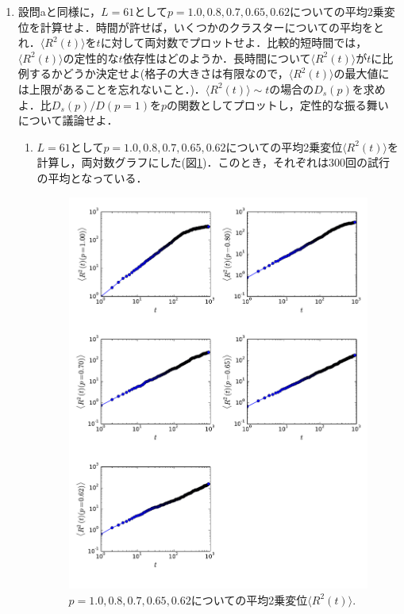 \documentclass{jsarticle}
\begin{document}
\begin{enumerate}
        \item 設問aと同様に，$L=61$として$p=1.0, 0.8, 0.7, 0.65, 0.62$についての平均2乗変位を計算せよ．時間が許せば，いくつかのクラスターについての平均をとれ．$\langle R^{2}(t) \rangle$を$t$に対して両対数でプロットせよ．比較的短時間では，$\langle R^{2}(t) \rangle$の定性的な$t$依存性はどのようか．長時間について$\langle R^{2}(t) \rangle$が$t$に比例するかどうか決定せよ(格子の大きさは有限なので，$\langle R^{2}(t) \rangle$の最大値には上限があることを忘れないこと．)．$\langle R^{2}(t) \rangle \sim t$の場合の$D_{s}(p)$を求めよ．比$D_{s}(p)/D(p=1)$を$p$の関数としてプロットし，定性的な振る舞いについて議論せよ．
            \begin{enumerate}
                \item $L=61$として$p=1.0, 0.8, 0.7, 0.65, 0.62$についての平均2乗変位$\langle R^{2}(t) \rangle$を計算し，両対数グラフにした(図\ref{fig:14-8-f4})．このとき，それぞれは300回の試行の平均となっている．
                
                \begin{figure}[H]
                    \begin{center}
                        \includegraphics[width=12.5cm]{figure_4.pdf}
                        \caption{$p=1.0, 0.8, 0.7, 0.65, 0.62$についての平均2乗変位$\langle R^{2}(t) \rangle$.}
                        \label{fig:14-8-f4}
                    \end{center}
                \end{figure}


\end{enumerate}
\end{enumerate}
\end{document}

